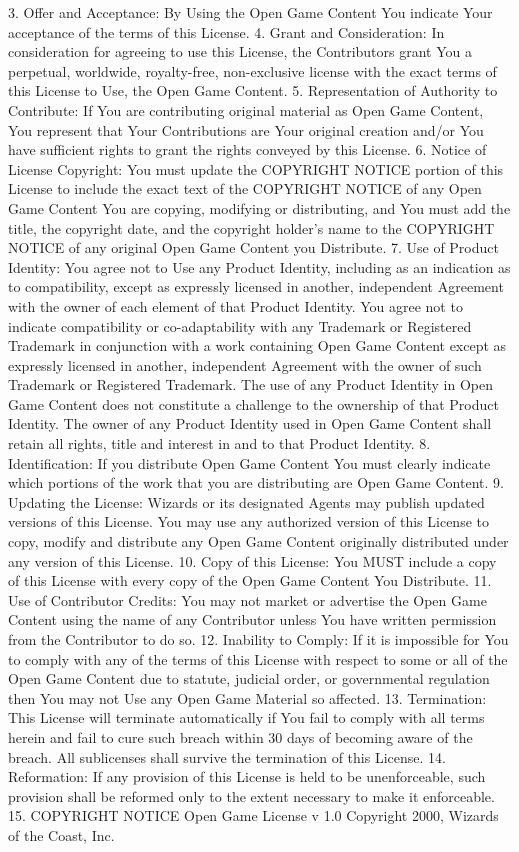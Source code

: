 {3. Offer and Acceptance: By Using the Open Game Content You indicate Your acceptance of the terms of this License.
4. Grant and Consideration: In consideration for agreeing to use this License, the Contributors grant You a perpetual, worldwide, royalty-free, non-exclusive license with the exact terms of this License to Use, the Open Game Content.
5. Representation of Authority to Contribute: If You are contributing original material as Open Game Content, You represent that Your Contributions are Your original creation and/or You have sufficient rights to grant the rights conveyed by this License.
6. Notice of License Copyright: You must update the COPYRIGHT NOTICE portion of this License to include the exact text of the COPYRIGHT NOTICE of any Open Game Content You are copying, modifying or distributing, and You must add the title, the copyright date, and the copyright holder's name to the COPYRIGHT NOTICE of any original Open Game Content you Distribute.
7. Use of Product Identity: You agree not to Use any Product Identity, including as an indication as to compatibility, except as expressly licensed in another, independent Agreement with the owner of each element of that Product Identity. You agree not to indicate compatibility or co-adaptability with any Trademark or Registered Trademark in conjunction with a work containing Open Game Content except as expressly licensed in another, independent Agreement with the owner of such Trademark or Registered Trademark. The use of any Product Identity in Open Game Content does not constitute a challenge to the ownership of that Product Identity. The owner of any Product Identity used in Open Game Content shall retain all rights, title and interest in and to that Product Identity.
8. Identification: If you distribute Open Game Content You must clearly indicate which portions of the work that you are distributing are Open Game Content.
9. Updating the License: Wizards or its designated Agents may publish updated versions of this License. You may use any authorized version of this License to copy, modify and distribute any Open Game Content originally distributed under any version of this License.
10. Copy of this License: You MUST include a copy of this License with every copy of the Open Game Content You Distribute.
11. Use of Contributor Credits: You may not market or advertise the Open Game Content using the name of any Contributor unless You have written permission from the Contributor to do so.
12. Inability to Comply: If it is impossible for You to comply with any of the terms of this License with respect to some or all of the Open Game Content due to statute, judicial order, or governmental regulation then You may not Use any Open Game Material so affected.
13. Termination: This License will terminate automatically if You fail to comply with all terms herein and fail to cure such breach within 30 days of becoming aware of the breach. All sublicenses shall survive the termination of this License.
14. Reformation: If any provision of this License is held to be unenforceable, such provision shall be reformed only to the extent necessary to make it enforceable.
15. COPYRIGHT NOTICE
Open Game License v 1.0 Copyright 2000, Wizards of the Coast, Inc.


} %